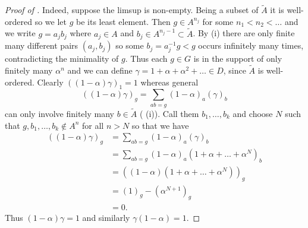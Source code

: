 \begin{proof}[Proof of ]
    Indeed, suppose the limsup is non-empty.
    Being a subset of $\tilde{A}$ it is well-ordered so we let $g$ be its least element.
    Then $g \in A^{n_j}$ for some $n_1 < n_2 < \dots$ and we write $g = a_j b_j$ where $a_j \in A$ and $b_j \in A^{n_j - 1} \subset \tilde{A}$.
    By  (i) there are only finite many different pairs $(a_j, b_j)$ so some $b_j = a_j^{-1} g < g$ occurs infinitely many times, contradicting the minimality of $g$.
    Thus each $g \in G$ is in the support of only finitely many $\alpha^n$ and we can define $\gamma = 1 + \alpha + \alpha^2 + \dots \in D$, since $\tilde{A}$ is well-ordered.
    Clearly $((1 - \alpha)\gamma)_1 = 1$ whereas general \[
        ((1-\alpha)\gamma)_g = \sum_{ab = g} (1 - \alpha)_a (\gamma)_b
    \] can only involve finitely many $b \in \tilde{A}$ ( (i)).
    Call them $b_1, \dots, b_k$ and choose $N$ such that $g, b_1, \dots, b_k \notin A^n$ for all $n > N$ so that we have
    \begin{align*}
        ((1 - \alpha)\gamma)_g
        &= \sum_{ab = g} (1 - \alpha)_a (\gamma)_b \\
        &= \sum_{ab = g} (1 - \alpha)_a (1 + \alpha + \dots + \alpha^N)_b \\
        &= ((1 - \alpha)(1 + \alpha + \dots + \alpha^N))_g \\
        &= (1)_g - (\alpha^{N+1})_g \\
        &= 0.
    \end{align*}
    Thus $(1 - \alpha) \gamma = 1$ and similarly $\gamma (1 - \alpha) = 1$.
\end{proof}

